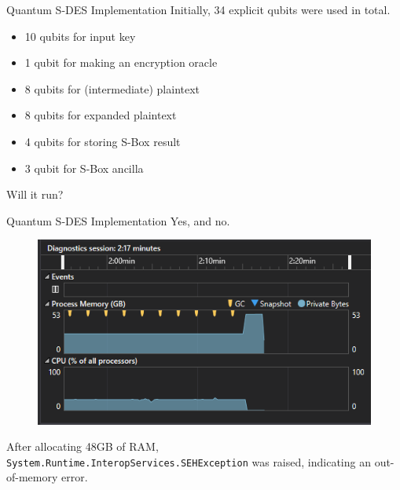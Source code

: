 \documentclass{beamer}
\begin{document}
   	\begin{frame}{Quantum S-DES Implementation}
        Initially, 34 explicit qubits were used in total.
   		\begin{itemize}
            \item 10 qubits for input key
            \item 1 qubit for making an encryption oracle
            \item 8 qubits for (intermediate) plaintext
            \item 8 qubits for expanded plaintext
            \item 4 qubits for storing S-Box result
            \item 3 qubit for S-Box ancilla
   		\end{itemize}
        Will it run?
   	\end{frame}
       
   	\begin{frame}{Quantum S-DES Implementation}
        Yes, and no.
   		\begin{figure}[h]
            \centering
            \includegraphics[height=0.5\textheight]{./Images/Qsharp-SDES-memory-error-2.png}
        \end{figure}
        After allocating 48GB of RAM, \texttt{System.Runtime.InteropServices.SEHException} was raised, indicating an out-of-memory error.
   	\end{frame}
       
\end{document}
